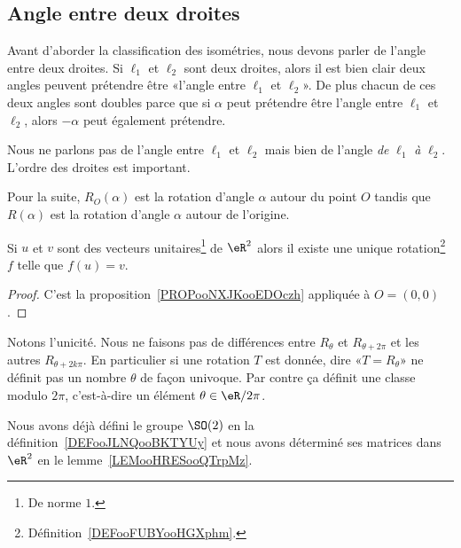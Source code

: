 \subsection{Angle entre deux droites}

Avant d'aborder la classification des isométries, nous devons parler de l'angle entre deux droites. Si \( \ell_1\) et \( \ell_2\) sont deux droites, alors il est bien clair deux angles peuvent prétendre être «l'angle entre \( \ell_1\) et \( \ell_2\)». De plus chacun de ces deux angles sont doubles parce que si \( \alpha\) peut prétendre être l'angle entre \( \ell_1\) et \( \ell_2\), alors \( -\alpha\) peut également prétendre.

\begin{remark}
    Nous ne parlons pas de l'angle entre \( \ell_1\) et \( \ell_2\) mais bien de l'angle \emph{de} \( \ell_1\) \emph{à} \( \ell_2\). L'ordre des droites est important.
\end{remark}

\begin{normaltext}
    Pour la suite, \( R_O(\alpha)\) est la rotation d'angle \( \alpha\) autour du point \( O\) tandis que \( R(\alpha)\) est la rotation d'angle \( \alpha\) autour de l'origine. 
\end{normaltext}

\begin{proposition}      \label{PROPooDWIMooQPkobw}
    Si \( u\) et \( v\) sont des vecteurs unitaires\footnote{De norme \( 1\).} de \( \eR^2\) alors il existe une unique rotation\footnote{Définition~\ref{DEFooFUBYooHGXphm}.} \( f\) telle que \( f(u)=v\).
\end{proposition}

\begin{proof}
    C'est la proposition~\ref{PROPooNXJKooEDOczh} appliquée à \( O=(0,0)\).
\end{proof}

\begin{remark}
    Notons l'unicité. Nous ne faisons pas de différences entre \( R_{\theta}\) et \( R_{\theta+2\pi}\) et les autres \( R_{\theta+2k\pi}\). En particulier si une rotation \( T\) est donnée, dire «\( T=R_{\theta}\)» ne définit pas un nombre \( \theta\) de façon univoque. Par contre ça définit une classe modulo \( 2\pi\), c'est-à-dire un élément \( \theta\in \eR/2\pi\).

    Nous avons déjà défini le groupe \( \SO(2)\) en la définition~\ref{DEFooJLNQooBKTYUy} et nous avons déterminé ses matrices dans \( \eR^2\) en le lemme~\ref{LEMooHRESooQTrpMz}.
\end{remark}



